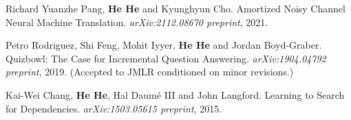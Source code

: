 Richard Yuanzhe Pang, \textbf{He He} and Kyunghyun Cho. Amortized Noisy Channel Neural Machine Translation. \textit{arXiv:2112.08670 preprint}, 2021.

Petro Rodriguez, Shi Feng, Mohit Iyyer, \textbf{He He} and Jordan Boyd-Graber. Quizbowl: The Case for Incremental Question Answering. \textit{arXiv:1904.04792 preprint}, 2019. (Accepted to JMLR conditioned on minor revisions.)

Kai-Wei Chang, \textbf{He He}, Hal Daum\'e III and John Langford. Learning to Search for Dependencies. \textit{arXiv:1503.05615 preprint}, 2015.


